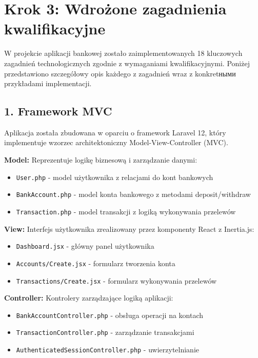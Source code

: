 \section{Krok 3: Wdrożone zagadnienia kwalifikacyjne}

W projekcie aplikacji bankowej zostało zaimplementowanych 18 kluczowych zagadnień technologicznych zgodnie z wymaganiami kwalifikacyjnymi. Poniżej przedstawiono szczegółowy opis każdego z zagadnień wraz z konkretными przykładami implementacji.

\subsection{1. Framework MVC}

Aplikacja została zbudowana w oparciu o framework Laravel 12, który implementuje wzorzec architektoniczny Model-View-Controller (MVC).

\textbf{Model:} Reprezentuje logikę biznesową i zarządzanie danymi:
\begin{itemize}
    \item \texttt{User.php} - model użytkownika z relacjami do kont bankowych
    \item \texttt{BankAccount.php} - model konta bankowego z metodami deposit/withdraw
    \item \texttt{Transaction.php} - model transakcji z logiką wykonywania przelewów
\end{itemize}

\textbf{View:} Interfejs użytkownika zrealizowany przez komponenty React z Inertia.js:
\begin{itemize}
    \item \texttt{Dashboard.jsx} - główny panel użytkownika
    \item \texttt{Accounts/Create.jsx} - formularz tworzenia konta
    \item \texttt{Transactions/Create.jsx} - formularz wykonywania przelewów
\end{itemize}

\textbf{Controller:} Kontrolery zarządzające logiką aplikacji:
\begin{itemize}
    \item \texttt{BankAccountController.php} - obsługa operacji na kontach
    \item \texttt{TransactionController.php} - zarządzanie transakcjami
    \item \texttt{AuthenticatedSessionController.php} - uwierzytelnianie
\end{itemize}


